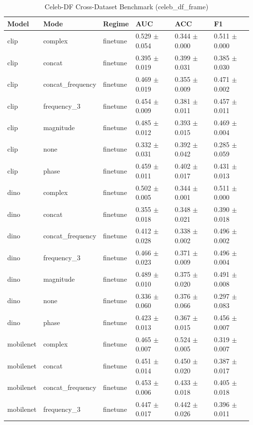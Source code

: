 \begin{table}
\caption{Celeb-DF Cross-Dataset Benchmark (celeb_df_frame)}
\label{tab:celebdf_celeb_df_frame}
\begin{tabular}{llllll}
\toprule
Model & Mode & Regime & AUC & ACC & F1 \\
\midrule
clip & complex & finetune & 0.529 $\pm$ 0.054 & 0.344 $\pm$ 0.000 & 0.511 $\pm$ 0.000 \\
clip & concat & finetune & 0.395 $\pm$ 0.019 & 0.399 $\pm$ 0.031 & 0.385 $\pm$ 0.030 \\
clip & concat_frequency & finetune & 0.469 $\pm$ 0.019 & 0.355 $\pm$ 0.009 & 0.471 $\pm$ 0.002 \\
clip & frequency_3 & finetune & 0.454 $\pm$ 0.009 & 0.381 $\pm$ 0.011 & 0.457 $\pm$ 0.011 \\
clip & magnitude & finetune & 0.485 $\pm$ 0.012 & 0.393 $\pm$ 0.015 & 0.469 $\pm$ 0.004 \\
clip & none & finetune & 0.332 $\pm$ 0.031 & 0.392 $\pm$ 0.042 & 0.285 $\pm$ 0.059 \\
clip & phase & finetune & 0.459 $\pm$ 0.011 & 0.402 $\pm$ 0.017 & 0.431 $\pm$ 0.013 \\
dino & complex & finetune & 0.502 $\pm$ 0.005 & 0.344 $\pm$ 0.001 & 0.511 $\pm$ 0.000 \\
dino & concat & finetune & 0.355 $\pm$ 0.018 & 0.348 $\pm$ 0.021 & 0.390 $\pm$ 0.018 \\
dino & concat_frequency & finetune & 0.412 $\pm$ 0.028 & 0.338 $\pm$ 0.002 & 0.496 $\pm$ 0.002 \\
dino & frequency_3 & finetune & 0.466 $\pm$ 0.023 & 0.371 $\pm$ 0.009 & 0.496 $\pm$ 0.004 \\
dino & magnitude & finetune & 0.489 $\pm$ 0.010 & 0.375 $\pm$ 0.020 & 0.491 $\pm$ 0.008 \\
dino & none & finetune & 0.336 $\pm$ 0.060 & 0.376 $\pm$ 0.066 & 0.297 $\pm$ 0.083 \\
dino & phase & finetune & 0.423 $\pm$ 0.013 & 0.367 $\pm$ 0.015 & 0.456 $\pm$ 0.007 \\
mobilenet & complex & finetune & 0.465 $\pm$ 0.007 & 0.524 $\pm$ 0.005 & 0.319 $\pm$ 0.007 \\
mobilenet & concat & finetune & 0.451 $\pm$ 0.014 & 0.450 $\pm$ 0.020 & 0.387 $\pm$ 0.017 \\
mobilenet & concat_frequency & finetune & 0.453 $\pm$ 0.006 & 0.433 $\pm$ 0.018 & 0.405 $\pm$ 0.018 \\
mobilenet & frequency_3 & finetune & 0.447 $\pm$ 0.017 & 0.442 $\pm$ 0.026 & 0.396 $\pm$ 0.011 \\

\end{tabular}
\end{table}
